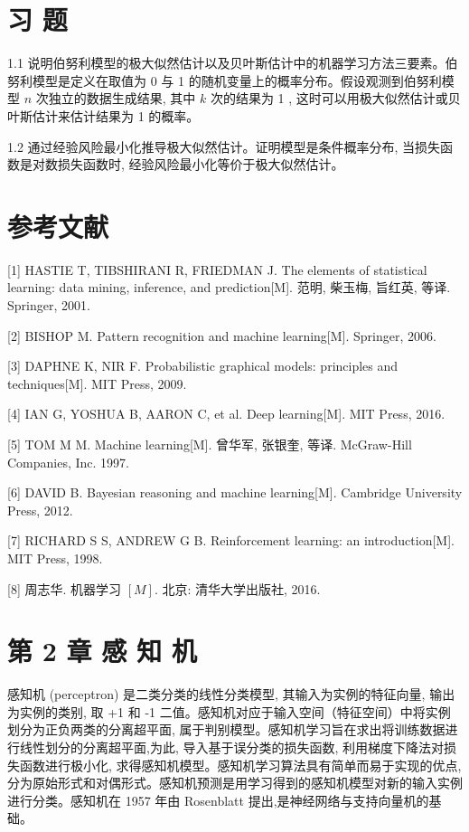 \documentclass[10pt]{article}
\begin{document}
\section*{习 题}
1.1 说明伯努利模型的极大似然估计以及贝叶斯估计中的机器学习方法三要素。伯努利模型是定义在取值为 0 与 1 的随机变量上的概率分布。假设观测到伯努利模型 $n$ 次独立的数据生成结果, 其中 $k$ 次的结果为 1 , 这时可以用极大似然估计或贝叶斯估计来估计结果为 1 的概率。

1.2 通过经验风险最小化推导极大似然估计。证明模型是条件概率分布, 当损失函数是对数损失函数时, 经验风险最小化等价于极大似然估计。

\section*{参考文献}
[1] HASTIE T, TIBSHIRANI R, FRIEDMAN J. The elements of statistical learning: data mining, inference, and prediction[M]. 范明, 柴玉梅, 旨红英, 等译. Springer, 2001.

[2] BISHOP M. Pattern recognition and machine learning[M]. Springer, 2006.

[3] DAPHNE K, NIR F. Probabilistic graphical models: principles and techniques[M]. MIT Press, 2009.

[4] IAN G, YOSHUA B, AARON C, et al. Deep learning[M]. MIT Press, 2016.

[5] TOM M M. Machine learning[M]. 曾华军, 张银奎, 等译. McGraw-Hill Companies, Inc. 1997.

[6] DAVID B. Bayesian reasoning and machine learning[M]. Cambridge University Press, 2012.

[7] RICHARD S S, ANDREW G B. Reinforcement learning: an introduction[M]. MIT Press, 1998.

[8] 周志华. 机器学习 $[M]$. 北京: 清华大学出版社, 2016.

\section*{第 2 章 感 知 机}
感知机 (perceptron) 是二类分类的线性分类模型, 其输入为实例的特征向量, 输出为实例的类别, 取 +1 和 -1 二值。感知机对应于输入空间（特征空间）中将实例划分为正负两类的分离超平面, 属于判别模型。感知机学习旨在求出将训练数据进行线性划分的分离超平面,为此, 导入基于误分类的损失函数, 利用梯度下降法对损失函数进行极小化, 求得感知机模型。感知机学习算法具有简单而易于实现的优点, 分为原始形式和对偶形式。感知机预测是用学习得到的感知机模型对新的输入实例进行分类。感知机在 1957 年由 Rosenblatt 提出,是神经网络与支持向量机的基础。
\end{document}
